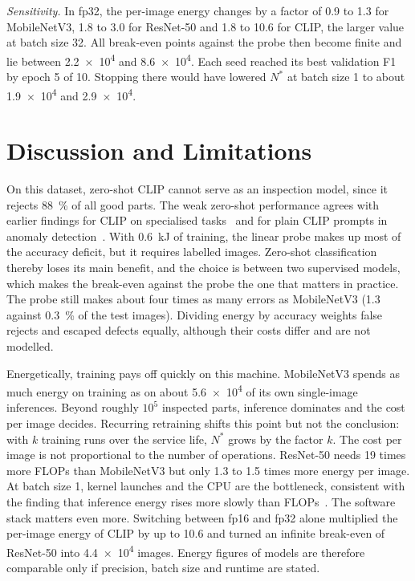 \documentclass[conference]{IEEEtran}
\begin{document}
\emph{Sensitivity.} In fp32, the per-image energy changes by a factor of 0.9 to 1.3 for MobileNetV3,
1.8 to 3.0 for ResNet-50 and 1.8 to 10.6 for CLIP, the larger value at batch size 32. All
break-even points against the probe then become finite and lie between \num{2.2e4} and \num{8.6e4}. Each seed reached its best validation F1 by epoch 5 of 10. Stopping there would have lowered $N^{*}$
at batch size 1 to about \num{1.9e4} and \num{2.9e4}.

\section{Discussion and Limitations}
On this dataset, zero-shot CLIP cannot serve as an inspection model, since it rejects
\SI{88}{\percent} of all good parts. The weak zero-shot performance agrees
with earlier findings for CLIP on specialised tasks~\cite{radford2021clip} and for plain CLIP prompts in
anomaly detection~\cite{zhou2024anomalyclip}. With \SI{0.6}{kJ} of training, the linear probe makes
up most of the accuracy deficit, but it requires labelled images. Zero-shot classification thereby loses
its main benefit, and the choice is between two supervised models, which makes the break-even against the probe the one
that matters in practice. The probe still makes about four times as many errors as
MobileNetV3 (1.3 against \SI{0.3}{\percent} of the test images). Dividing energy by accuracy weights false
rejects and escaped defects equally, although their costs differ and are not modelled.

Energetically, training pays off quickly on this machine. MobileNetV3
spends as much energy on training as on about \num{5.6e4} of its own single-image inferences.
Beyond roughly $10^{5}$ inspected parts, inference dominates and the cost per image decides. Recurring
retraining shifts this point but not the conclusion: with $k$ training runs over the service life,
$N^{*}$ grows by the factor $k$. The cost per image
is not proportional to the number of operations. ResNet-50 needs 19 times more FLOPs than MobileNetV3
but only 1.3 to 1.5 times more energy per image.
At batch size 1, kernel launches and the CPU are the bottleneck, consistent with the
finding that inference energy rises more slowly than FLOPs~\cite{desislavov2023trends}. The software
stack matters even more. Switching between fp16 and fp32 alone multiplied the per-image energy of CLIP
by up to 10.6 and turned an infinite break-even of ResNet-50 into \num{4.4e4} images. Energy figures of
models are therefore comparable only if precision, batch size and runtime are stated.
\end{document}
